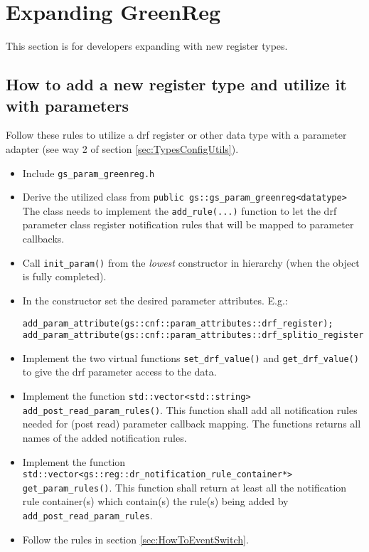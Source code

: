 
\section{Expanding GreenReg}
\label{sec:ExpandingGreenReg}

This section is for developers expanding \GreenReg with new register types.

\subsection{How to add a new register type and utilize it with parameters}
\label{sec:HowToUtilizeParameters}
Follow these rules to utilize a drf register or other data type with a \GreenConfig parameter adapter (see way 2 of section \ref{sec:TypesConfigUtils}).
\begin{itemize}
  \item Include \lstinline|gs_param_greenreg.h|
  \item Derive the utilized class from \lstinline|public gs::gs_param_greenreg<datatype>|\newline
    The class needs to implement the \lstinline|add_rule(...)| function to let the drf parameter class register notification rules that will be mapped to parameter callbacks.
  \item Call \lstinline|init_param()| from the {\em lowest} constructor in hierarchy (when the object is fully completed).
  \item In the constructor set the desired parameter attributes. E.g.:\newline
\begin{lstlisting}
add_param_attribute(gs::cnf::param_attributes::drf_register);
add_param_attribute(gs::cnf::param_attributes::drf_splitio_register);
\end{lstlisting}
  \item Implement the two virtual functions \lstinline|set_drf_value()| and \lstinline|get_drf_value()| to give the drf parameter access to the data.
  \item Implement the function \lstinline|std::vector<std::string> add_post_read_param_rules()|.\newline
  This function shall add all notification rules needed for (post read) parameter callback mapping. The functions returns all names of the added notification rules.
  \item Implement the function \lstinline|std::vector<gs::reg::dr_notification_rule_container*> get_param_rules()|.\newline
  This function shall return at least all the notification rule container(s) which contain(s) the rule(s) being 
   added by \lstinline|add_post_read_param_rules|.
  \item Follow the rules in section \ref{sec:HowToEventSwitch}.
\end{itemize}

